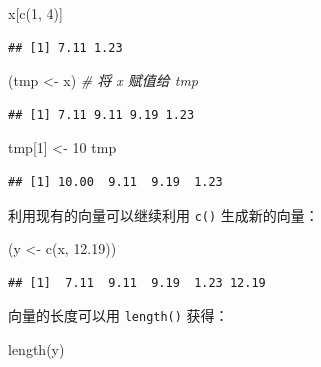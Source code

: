 \documentclass[
  b5paper,
  UTF8,twoside]{book}
\newenvironment{Shaded}{\begin{snugshade}}{\end{snugshade}}
\newcommand{\CommentTok}[1]{\textcolor[rgb]{0.56,0.35,0.01}{\textit{#1}}}
\newcommand{\DecValTok}[1]{\textcolor[rgb]{0.00,0.00,0.81}{#1}}
\newcommand{\FloatTok}[1]{\textcolor[rgb]{0.00,0.00,0.81}{#1}}
\newcommand{\FunctionTok}[1]{\textcolor[rgb]{0.00,0.00,0.00}{#1}}
\newcommand{\NormalTok}[1]{#1}
\newcommand{\OtherTok}[1]{\textcolor[rgb]{0.56,0.35,0.01}{#1}}
\begin{document}
\begin{Shaded}
\begin{Highlighting}[]
\NormalTok{x[}\FunctionTok{c}\NormalTok{(}\DecValTok{1}\NormalTok{, }\DecValTok{4}\NormalTok{)]}
\end{Highlighting}
\end{Shaded}

\begin{verbatim}
## [1] 7.11 1.23
\end{verbatim}

\begin{Shaded}
\begin{Highlighting}[]
\NormalTok{(tmp }\OtherTok{\textless{}{-}}\NormalTok{ x) }\CommentTok{\# 将 x 赋值给 tmp}
\end{Highlighting}
\end{Shaded}

\begin{verbatim}
## [1] 7.11 9.11 9.19 1.23
\end{verbatim}

\begin{Shaded}
\begin{Highlighting}[]
\NormalTok{tmp[}\DecValTok{1}\NormalTok{] }\OtherTok{\textless{}{-}} \DecValTok{10}
\NormalTok{tmp}
\end{Highlighting}
\end{Shaded}

\begin{verbatim}
## [1] 10.00  9.11  9.19  1.23
\end{verbatim}

利用现有的向量可以继续利用 \texttt{c()} 生成新的向量：

\begin{Shaded}
\begin{Highlighting}[]
\NormalTok{(y }\OtherTok{\textless{}{-}} \FunctionTok{c}\NormalTok{(x, }\FloatTok{12.19}\NormalTok{))}
\end{Highlighting}
\end{Shaded}

\begin{verbatim}
## [1]  7.11  9.11  9.19  1.23 12.19
\end{verbatim}

向量的长度可以用 \texttt{length()} 获得：

\begin{Shaded}
\begin{Highlighting}[]
\FunctionTok{length}\NormalTok{(y)}
\end{Highlighting}
\end{Shaded}
\end{document}
